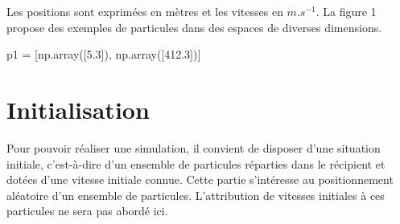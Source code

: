 \documentclass[twoside,french,11pt]{VcCours}
\begin{document}
Les positions sont exprimées en mètres et les vitesses en $m.s^{−1}$. La figure 1 propose des exemples de particules
dans des espaces de diverses dimensions.
\begin{Python*} 
p1 = [np.array([5.3]), np.array([412.3])]
\end{Python*} 


\section*{Initialisation}
Pour pouvoir réaliser une simulation, il convient de disposer d'une situation initiale, c'est-à-dire d'un ensemble
de particules réparties dans le récipient et dotées d'une vitesse initiale connue. Cette partie s'intéresse au
positionnement aléatoire d'un ensemble de particules. L'attribution de vitesses initiales à ces particules ne sera
pas abordé ici.
\end{document}
